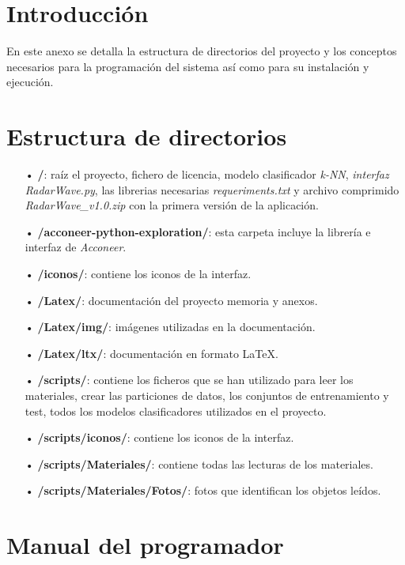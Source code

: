 
\section{Introducción}
En este anexo se detalla la estructura de directorios del proyecto y los conceptos necesarios para la programación del sistema así como para su instalación y ejecución. 

\section{Estructura de directorios}
\begin{itemize}
	\tightlist
	\item[•] \textbf{/}: raíz el proyecto, fichero de licencia, modelo clasificador \textit{k-NN}, \textit{interfaz RadarWave.py}, las librerias necesarias \textit{requeriments.txt} y archivo comprimido \textit{RadarWave\_v1.0.zip} con la primera versión de la aplicación.
	\item[•] \textbf{/acconeer-python-exploration/}: esta carpeta incluye la librería e interfaz de \textit{Acconeer}.
	\item[•] \textbf{/iconos/}: contiene los iconos de la interfaz.
	\item[•] \textbf{/Latex/}: documentación del proyecto memoria y anexos.
	\item[•] \textbf{/Latex/img/}: imágenes utilizadas en la documentación.
	\item[•] \textbf{/Latex/ltx/}: documentación en formato \LaTeX.
	\item[•] \textbf{/scripts/}: contiene los ficheros que se han utilizado para leer los materiales, crear las particiones de datos, los conjuntos de entrenamiento y test, todos los modelos clasificadores utilizados en el proyecto.
	\item[•] \textbf{/scripts/iconos/}: contiene los iconos de la interfaz.
	\item[•] \textbf{/scripts/Materiales/}: contiene todas las lecturas de los materiales.
	\item[•] \textbf{/scripts/Materiales/Fotos/}: fotos que identifican los objetos leídos.
\end{itemize}

\section{Manual del programador}

